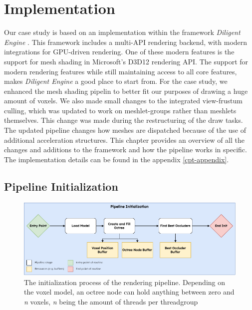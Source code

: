 \chapter{Implementation} \label{cpt-implementation}

Our case study is based on an implementation within the framework \emph{Diligent Engine} 
\cite{DiligentGraphicsGitHub, DiligentGraphics}. This framework includes a multi-\ac{API} rendering backend, 
with modern integrations for \ac{GPU}-driven rendering. One of these modern features is the support for mesh 
shading in Microsoft's D3D12 rendering \ac{API}. The support for modern rendering features while still 
maintaining access to all core features, makes \emph{Diligent Engine} a good place to start from. For the case 
study, we enhanced the mesh shading pipelin to better fit our purposes of drawing a huge amount of voxels. We 
also made small changes to the integrated view-frustum culling, which was updated to work on meshlet-groups 
rather than meshlets themselves. This change was made during the restructuring of the draw tasks. The updated 
pipeline changes how meshes are dispatched because of the use of additional acceleration structures. This 
chapter provides an overview of all the changes and additions to the framework and how the pipeline works in 
specific. The implementation details can be found in the appendix \ref{cpt-appendix}.

\section{Pipeline Initialization} \label{sec-piepline-initialization}

\begin{figure}[h]
    \centering
    \includegraphics[width=\linewidth]{images/graphics/pipeline-initialization.png}
    \caption{The initialization process of the rendering pipeline. Depending on the voxel model, an octree node 
    can hold anything between zero and \emph{n} voxels, \emph{n} being the amount of threads per threadgroup}
    \label{fig:pipeline-initialization}
\end{figure}

